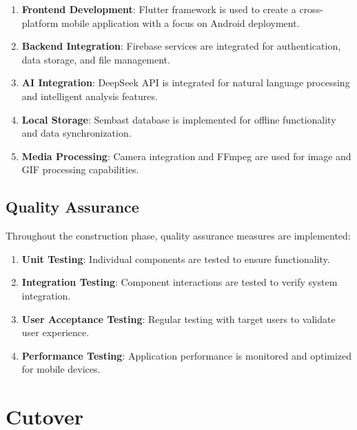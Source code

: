 \begin{enumerate}
    \item \textbf{Frontend Development}: Flutter framework is used to create a cross-platform mobile application with a focus on Android deployment.
    
    \item \textbf{Backend Integration}: Firebase services are integrated for authentication, data storage, and file management.
    
    \item \textbf{AI Integration}: DeepSeek API is integrated for natural language processing and intelligent analysis features.
    
    \item \textbf{Local Storage}: Sembast database is implemented for offline functionality and data synchronization.
    
    \item \textbf{Media Processing}: Camera integration and FFmpeg are used for image and GIF processing capabilities.
\end{enumerate}

\subsection{Quality Assurance}\label{subsec:qualityAssurance}

Throughout the construction phase, quality assurance measures are implemented:

\begin{enumerate}
    \item \textbf{Unit Testing}: Individual components are tested to ensure functionality.
    
    \item \textbf{Integration Testing}: Component interactions are tested to verify system integration.
    
    \item \textbf{User Acceptance Testing}: Regular testing with target users to validate user experience.
    
    \item \textbf{Performance Testing}: Application performance is monitored and optimized for mobile devices.
\end{enumerate}

\section{Cutover}\label{sec:cutover}

